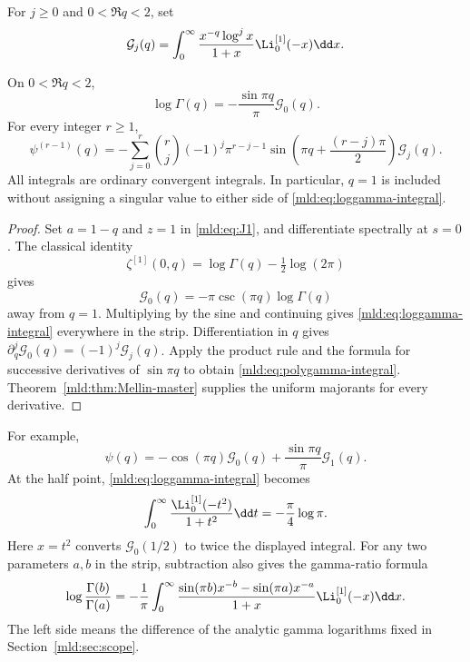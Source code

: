 For $j\ge0$ and $0<\Re q<2$, set
\begin{equation}\label{mld:eq:gamma-kernel}
 \mathcal G_j(q)=\int_0^\infty
       \frac{x^{-q}\log^j x}{1+x}\Li_0^{[1]}(-x)\dd x.
\end{equation}

\begin{theorem}\label{mld:thm:gamma-kernel}
On $0<\Re q<2$,
\begin{equation}\label{mld:eq:loggamma-integral}
 \boxed{\displaystyle
 \log\Gamma(q)=-\frac{\sin\pi q}{\pi}\mathcal G_0(q).}
\end{equation}
For every integer $r\ge1$,
\begin{equation}\label{mld:eq:polygamma-integral}
 \psi^{(r-1)}(q)=
 -\sum_{j=0}^{r}\binom rj(-1)^j\pi^{r-j-1}
       \sin\!\left(\pi q+\frac{(r-j)\pi}{2}\right)\mathcal G_j(q).
\end{equation}
All integrals are ordinary convergent integrals. In particular, $q=1$ is included without assigning a singular value to either side of \eqref{mld:eq:loggamma-integral}.
\end{theorem}

\begin{proof}
Set $a=1-q$ and $z=1$ in \eqref{mld:eq:J1}, and differentiate spectrally at $s=0$. The classical identity
\[
 \zeta^{[1]}(0,q)=\log\Gamma(q)-\tfrac12\log(2\pi)
\]
gives
\[
 \mathcal G_0(q)=-\pi\csc(\pi q)\log\Gamma(q)
\]
away from $q=1$. Multiplying by the sine and continuing gives \eqref{mld:eq:loggamma-integral} everywhere in the strip. Differentiation in $q$ gives
$\partial_q^j\mathcal G_0(q)=(-1)^j\mathcal G_j(q)$.
Apply the product rule and the formula for successive derivatives of $\sin\pi q$ to obtain \eqref{mld:eq:polygamma-integral}. Theorem~\ref{mld:thm:Mellin-master} supplies the uniform majorants for every derivative.
\end{proof}

For example,
\[
 \psi(q)=-\cos(\pi q)\mathcal G_0(q)
                  +\frac{\sin\pi q}{\pi}\mathcal G_1(q).
\]
At the half point, \eqref{mld:eq:loggamma-integral} becomes
\begin{equation}\label{mld:eq:gamma-half-integral}
 \int_0^\infty\frac{\Li_0^{[1]}(-t^2)}{1+t^2}\dd t
       =-\frac\pi4\log\pi.
\end{equation}
Here $x=t^2$ converts $\mathcal G_0(1/2)$ to twice the displayed integral.
For any two parameters $a,b$ in the strip, subtraction also gives the gamma-ratio formula
\begin{align}\label{mld:eq:gamma-ratio-integral}
 \log\frac{\Gamma(b)}{\Gamma(a)}
   =-\frac1\pi\int_0^\infty
       \frac{\sin(\pi b)x^{-b}-\sin(\pi a)x^{-a}}{1+x}
                         \Li_0^{[1]}(-x)\dd x.
\end{align}
The left side means the difference of the analytic gamma logarithms fixed in Section~\ref{mld:sec:scope}.

